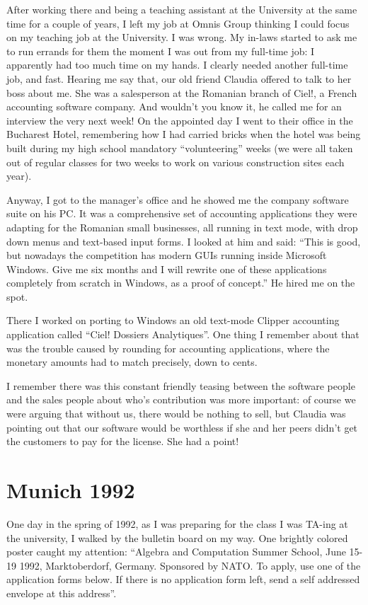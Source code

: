 \documentclass[12pt]{book}
\begin{document}
After working there and being a teaching assistant at the University at
the same time for a couple of years, I left my job at Omnis Group
thinking I could focus on my teaching job at the University. I was
wrong. My in-laws started to ask me to run errands for them the moment I
was out from my full-time job: I apparently had too much time on my
hands. I clearly needed another full-time job, and fast. Hearing me say
that, our old friend Claudia offered to talk to her boss about me. She
was a salesperson at the Romanian branch of Ciel!, a French accounting
software company. And wouldn't you know it, he called me for an
interview the very next week! On the appointed day I went to their
office in the Bucharest Hotel, remembering how I had carried bricks when
the hotel was being built during my high school mandatory
``volunteering'' weeks (we were all taken out of regular classes for two
weeks to work on various construction sites each year).

Anyway, I got to the manager's office and he showed me the company
software suite on his PC. It was a comprehensive set of accounting
applications they were adapting for the Romanian small businesses, all
running in text mode, with drop down menus and text-based input forms. I
looked at him and said: ``This is good, but nowadays the competition has
modern GUIs running inside Microsoft Windows. Give me six months and I
will rewrite one of these applications completely from scratch in
Windows, as a proof of concept.'' He hired me on the spot.

There I worked on porting to Windows an old text-mode Clipper accounting
application called ``Ciel! Dossiers Analytiques''. One thing I remember
about that was the trouble caused by rounding for accounting
applications, where the monetary amounts had to match precisely, down to
cents.

I remember there was this constant friendly teasing between the software
people and the sales people about who's contribution was more important:
of course we were arguing that without us, there would be nothing to
sell, but Claudia was pointing out that our software would be worthless
if she and her peers didn't get the customers to pay for the license.
She had a point!


\section{Munich 1992}

One day in the spring of 1992, as I was preparing for the class I was
TA-ing at the university, I walked by the bulletin board on my way. One
brightly colored poster caught my attention: ``Algebra and Computation
Summer School, June 15-19 1992, Marktoberdorf, Germany. Sponsored by
NATO. To apply, use one of the application forms below. If there is no
application form left, send a self addressed envelope at this address''.
\end{document}
